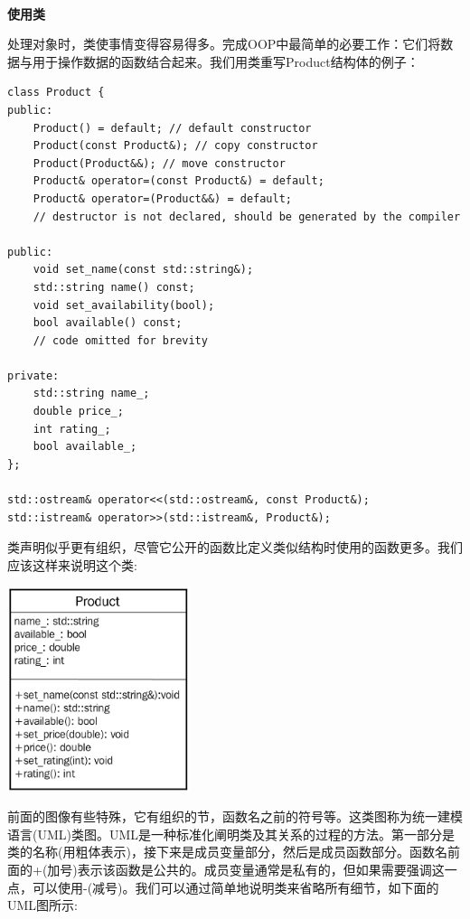 \noindent\textbf{}\ \par
\textbf{使用类} \ \par
处理对象时，类使事情变得容易得多。完成OOP中最简单的必要工作：它们将数据与用于操作数据的函数结合起来。我们用类重写Product结构体的例子： \par

\begin{lstlisting}[caption={}]
class Product {
public:
	Product() = default; // default constructor
	Product(const Product&); // copy constructor
	Product(Product&&); // move constructor
	Product& operator=(const Product&) = default;
	Product& operator=(Product&&) = default;
	// destructor is not declared, should be generated by the compiler
	
public:
	void set_name(const std::string&);
	std::string name() const;
	void set_availability(bool);
	bool available() const;
	// code omitted for brevity
	
private:
	std::string name_;
	double price_;
	int rating_;
	bool available_;
};

std::ostream& operator<<(std::ostream&, const Product&);
std::istream& operator>>(std::istream&, Product&);
\end{lstlisting}

类声明似乎更有组织，尽管它公开的函数比定义类似结构时使用的函数更多。我们应该这样来说明这个类: \par

\begin{center}
	\includegraphics[width=0.4\textwidth]{content/Section-1/Chapter-3/5}
\end{center}

前面的图像有些特殊，它有组织的节，函数名之前的符号等。这类图称为统一建模语言(UML)类图。UML是一种标准化阐明类及其关系的过程的方法。第一部分是类的名称(用粗体表示)，接下来是成员变量部分，然后是成员函数部分。函数名前面的+(加号)表示该函数是公共的。成员变量通常是私有的，但如果需要强调这一点，可以使用-(减号)。我们可以通过简单地说明类来省略所有细节，如下面的UML图所示: \par

